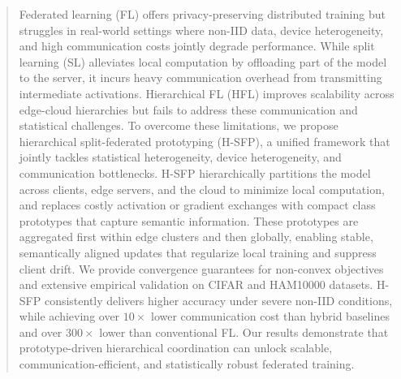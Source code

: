 
\begin{abstract}
Federated learning (FL) offers privacy-preserving distributed training but struggles in real-world settings where non-IID data, device heterogeneity, and high communication costs jointly degrade performance. While split learning (SL) alleviates local computation by offloading part of the model to the server, it incurs heavy communication overhead from transmitting intermediate activations. Hierarchical FL (HFL) improves scalability across edge-cloud hierarchies but fails to address these communication and statistical challenges.
To overcome these limitations, we propose hierarchical split-federated prototyping (H-SFP),  a unified framework that jointly tackles statistical heterogeneity, device heterogeneity, and communication bottlenecks. H-SFP hierarchically partitions the model across clients, edge servers, and the cloud to minimize local computation, and replaces costly activation or gradient exchanges with compact class prototypes that capture semantic information. These prototypes are aggregated first within edge clusters and then globally, enabling stable, semantically aligned updates that regularize local training and suppress client drift.
We provide convergence guarantees for non-convex objectives and extensive empirical validation on CIFAR and HAM10000 datasets. H-SFP consistently delivers higher accuracy under severe non-IID conditions, while achieving over $10\times$ lower communication cost than hybrid baselines and over $300\times$ lower than conventional FL. Our results demonstrate that prototype-driven hierarchical coordination can unlock scalable, communication-efficient, and statistically robust federated training.
\end{abstract}